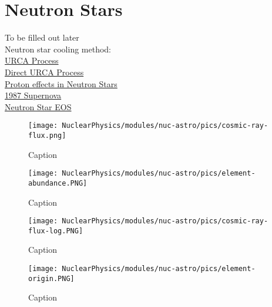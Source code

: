     \section{Neutron Stars}
        To be filled out later\\
        Neutron star cooling method:\\
        \href{https://en.wikipedia.org/wiki/Urca_process}{URCA Process}\\
        \href{https://arxiv.org/pdf/astro-ph/0404165.pdf}{Direct URCA Process}\\
        \href{http://news.mit.edu/2018/neutron-stars-protons-may-do-heavy-lifting-0813}{Proton effects in Neutron Stars}\\
        \href{https://en.wikipedia.org/wiki/SN_1987A}{1987 Supernova}\\
        \href{https://en.wikipedia.org/wiki/Neutron_star#Gravity_and_equation_of_state}{Neutron Star EOS}
        
        
        
         
     \begin{figure}[H]
        \centering
        \texttt{[image: NuclearPhysics/modules/nuc-astro/pics/cosmic-ray-flux.png]}
        \caption{Caption }
    \end{figure}       
        
        
        
                
         
     \begin{figure}[H]
        \centering
        \texttt{[image: NuclearPhysics/modules/nuc-astro/pics/element-abundance.PNG]}
        \caption{Caption }
    \end{figure} 



     \begin{figure}[H]
        \centering
        \texttt{[image: NuclearPhysics/modules/nuc-astro/pics/cosmic-ray-flux-log.PNG]}
        \caption{Caption }
    \end{figure} 



        
         
     \begin{figure}[H]
        \centering
        \texttt{[image: NuclearPhysics/modules/nuc-astro/pics/element-origin.PNG]}
        \caption{Caption }
    \end{figure} 